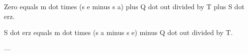 Zero equals m dot times (s e minus s a) plus Q dot out divided by T plus S dot erz.  

S dot erz equals m dot times (s a minus s e) minus Q dot out divided by T.  

---